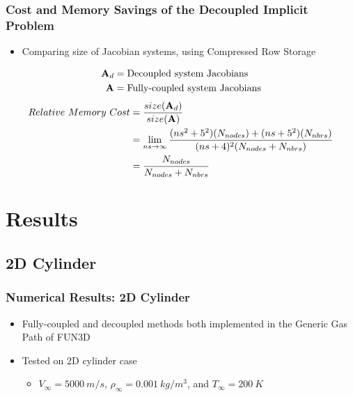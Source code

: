 \documentclass{beamer}
\begin{document}
\begin{frame}
  \frametitle{Cost and Memory Savings of the Decoupled Implicit Problem}
  \begin{itemize}
    \item Comparing size of Jacobian systems, using Compressed Row Storage
  \end{itemize}
  \begin{align*}
    \mathbf A_d &= \text{Decoupled system Jacobians} \\
    \mathbf A &= \text{Fully-coupled system Jacobians}
  \end{align*}
  \[
  \begin{split} Relative\ Memory\ Cost &=
    \frac{size(\mathbf A_d)}{size(\mathbf A)} \\ &= \lim_{ns\to\infty}
    \frac{(ns^2+5^2)(N_{nodes})+(ns+5^2)(N_{nbrs})}{(ns+4)^2(N_{nodes}+N_{nbrs})} \\
    &= \frac{N_{nodes}}{N_{nodes} + N_{nbrs}}
  \end{split}
  \]
\end{frame}

\section{Results}
\subsection{2D Cylinder}

\begin{frame}
  \frametitle{Numerical Results: 2D Cylinder}
  \begin{figure}[h]
  	\centering
  \end{figure}
  \begin{itemize}
    \item Fully-coupled and decoupled methods both implemented in the Generic
      Gas Path of FUN3D
    \item Tested on 2D cylinder case
      \begin{itemize}
        \item $V_{\infty} = 5000\ m/s$, $\rho_{\infty}=0.001\ kg/m^3$, 
          and $T_\infty = 200\ K$
      \end{itemize}
  \end{itemize}
\end{frame}
\end{document}
